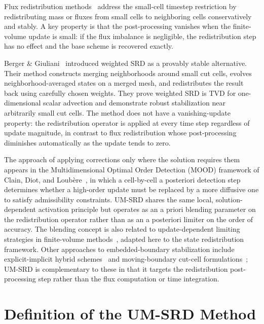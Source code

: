 \documentclass[11pt]{article}
\begin{document}
Flux redistribution methods~\cite{colella2006,berger1989} address the 
small-cell timestep restriction by redistributing mass or fluxes from small 
cells to neighboring cells conservatively and stably. A key property is that 
the post-processing vanishes when the finite-volume update is small: if the 
flux imbalance is negligible, the redistribution step has no effect and the 
base scheme is recovered exactly.

Berger \& Giuliani~\cite{berger2024} introduced weighted SRD as a provably 
stable alternative. Their method constructs merging neighborhoods around 
small cut cells, evolves neighborhood-averaged states on a merged mesh, and 
redistributes the result back using carefully chosen weights. They prove 
weighted SRD is TVD for one-dimensional scalar advection and demonstrate 
robust stabilization near arbitrarily small cut cells. The method does not 
have a vanishing-update property: the redistribution operator is applied at 
every time step regardless of update magnitude, in contrast to flux 
redistribution whose post-processing diminishes automatically as the update 
tends to zero.

The approach of applying corrections only where the solution requires them 
appears in the Multidimensional Optimal Order Detection (MOOD) framework of 
Clain, Diot, and Loub\`ere~\cite{clain2011}, in which a cell-by-cell 
a posteriori detection step determines whether a high-order update must be 
replaced by a more diffusive one to satisfy admissibility constraints. UM-SRD 
shares the same local, solution-dependent activation principle but operates 
as an a priori blending parameter on the redistribution operator rather than 
as an a posteriori limiter on the order of accuracy. The blending concept is also related to update-dependent limiting strategies 
in finite-volume methods~\cite{vanleer1979,sweby1984}, adapted here to the 
state redistribution framework. Other approaches to embedded-boundary 
stabilization include explicit-implicit hybrid schemes~\cite{may2017} and 
moving-boundary cut-cell formulations~\cite{schneiders2016}; UM-SRD is 
complementary to these in that it targets the redistribution post-processing 
step rather than the flux computation or time integration.

\section{Definition of the UM-SRD Method}\label{sec:framework}
\end{document}

